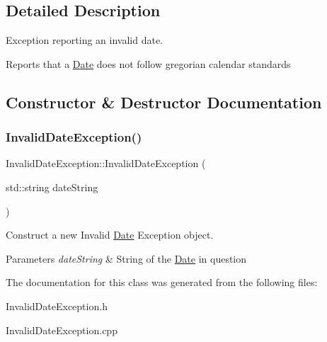 \subsection{Detailed Description}
Exception reporting an invalid date. 

Reports that a \mbox{\hyperlink{classDate}{Date}} does not follow gregorian calendar standards 

\subsection{Constructor \& Destructor Documentation}
\mbox{\label{classInvalidDateException_a0ae7a8a97c0442fc025cb63e3b86bee8}} 
\subsubsection{\texorpdfstring{Invalid\+Date\+Exception()}{InvalidDateException()}}
{\footnotesize\ttfamily Invalid\+Date\+Exception\+::\+Invalid\+Date\+Exception (\begin{DoxyParamCaption}\item[{std\+::string}]{date\+String }\end{DoxyParamCaption})}



Construct a new Invalid \mbox{\hyperlink{classDate}{Date}} Exception object. 


\begin{DoxyParams}{Parameters}
{\em date\+String} & String of the \mbox{\hyperlink{classDate}{Date}} in question \\
\hline
\end{DoxyParams}


The documentation for this class was generated from the following files\+:\begin{DoxyCompactItemize}
\item 
Invalid\+Date\+Exception.\+h\item 
Invalid\+Date\+Exception.\+cpp\end{DoxyCompactItemize}
